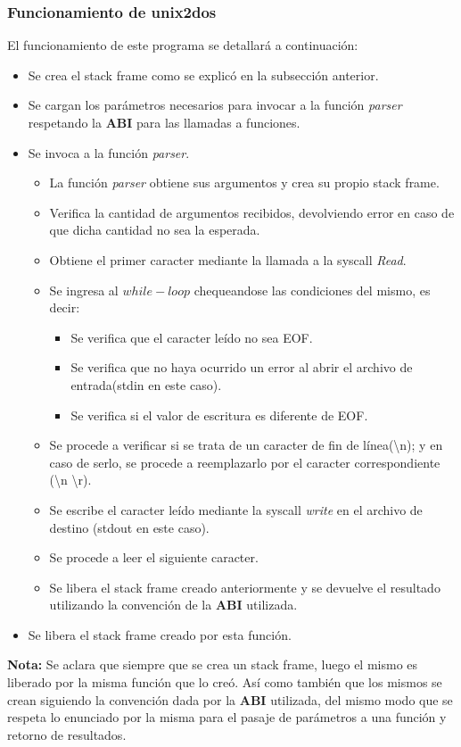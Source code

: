\documentclass[a4paper,10pt]{article}
\begin{document}
    \subsubsection{Funcionamiento de unix2dos}
    El funcionamiento de este programa se detallar\'a a continuaci\'on:
      \begin{itemize}
       \item Se crea el stack frame como se explic\'o en la subsecci\'on anterior.
       \item Se cargan los par\'ametros necesarios para invocar a la funci\'on \textit{parser} respetando la {\bf ABI} para las llamadas a funciones.
       \item Se invoca a la funci\'on \textit{parser}.
	\begin{itemize}
	\item La funci\'on \textit{parser} obtiene sus argumentos y crea su propio stack frame.
	\item Verifica la cantidad de argumentos recibidos, devolviendo error en caso de que dicha cantidad no sea la esperada.
	\item Obtiene el primer caracter mediante la llamada a la syscall \textit{Read}.
	\item Se ingresa al \textit{$while-loop$} chequeandose las condiciones del mismo, es decir:
	  \begin{itemize}
	    \item Se verifica que el caracter le\'ido no sea EOF.
	    \item Se verifica que no haya ocurrido un error al abrir el archivo de entrada(stdin en este caso).
	    \item Se verifica si el valor de escritura es diferente de EOF.
	  \end{itemize}
	\item Se procede a verificar si se trata de un caracter de fin de l\'inea(\textbackslash n); y en caso de serlo, se procede a reemplazarlo por el caracter correspondiente (\textbackslash n  \textbackslash r).
	\item Se escribe el caracter le\'ido mediante la syscall \textit{write} en el archivo de destino (stdout en este caso).
	\item Se procede a leer el siguiente caracter.
	\item Se libera el stack frame creado anteriormente y se devuelve el resultado utilizando la convenci\'on de la {\bf ABI} utilizada.
	\end{itemize}
       \item Se libera el stack frame creado por esta funci\'on.
      \end{itemize}
      {\bf Nota:} Se aclara que siempre que se crea un stack frame, luego el mismo es liberado por la misma funci\'on que lo cre\'o. As\'i como tambi\'en que los mismos
      se crean siguiendo la convenci\'on dada por la {\bf ABI} utilizada, del mismo modo que se respeta lo enunciado por la misma para el pasaje de par\'ametros a una funci\'on y
      retorno de resultados.
\end{document}
